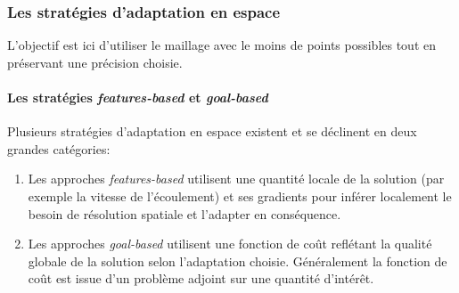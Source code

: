     \subsubsection{Les stratégies d'adaptation en espace}
        L'objectif est ici d'utiliser le maillage avec le moins de points possibles tout en préservant une précision choisie.
        \paragraph{Les stratégies \textit{features-based} et \textit{goal-based}}
        Plusieurs stratégies d'adaptation en espace existent et se déclinent en deux grandes catégories\cite{Vivarelli2025Fluids}:
        \begin{enumerate}
            \item Les approches \textit{features-based} utilisent une quantité locale de la solution (par exemple la vitesse de l'écoulement) 
            et ses gradients pour inférer localement le besoin de résolution spatiale et l'adapter en conséquence.
            \item Les approches \textit{goal-based} utilisent une fonction de coût reflétant la qualité globale de la solution selon l'adaptation choisie.
            Généralement la fonction de coût est issue d'un problème adjoint sur une quantité d'intérêt.
        \end{enumerate}
